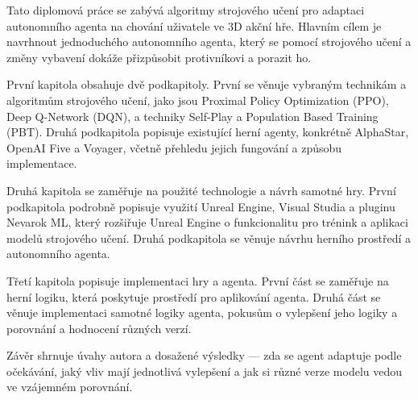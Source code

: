 Tato diplomová práce se zabývá algoritmy strojového učení pro adaptaci autonomního agenta na chování uživatele ve 3D akční hře. Hlavním cílem je navrhnout jednoduchého autonomního agenta, který se pomocí strojového učení a změny vybavení dokáže přizpůsobit protivníkovi a porazit ho.

První kapitola obsahuje dvě podkapitoly. První se věnuje vybraným technikám a algoritmům strojového učení, jako jsou Proximal Policy Optimization (PPO), Deep Q-Network (DQN), a techniky Self-Play a Population Based Training (PBT). Druhá podkapitola popisuje existující herní agenty, konkrétně AlphaStar, OpenAI Five a Voyager, včetně přehledu jejich fungování a způsobu implementace.

Druhá kapitola se zaměřuje na použité technologie a návrh samotné hry. První podkapitola podrobně popisuje využití Unreal Engine, Visual Studia a pluginu Nevarok ML, který rozšiřuje Unreal Engine o funkcionalitu pro trénink a aplikaci modelů strojového učení. Druhá podkapitola se věnuje návrhu herního prostředí a autonomního agenta.

Třetí kapitola popisuje implementaci hry a agenta. První část se zaměřuje na herní logiku, která poskytuje prostředí pro aplikování agenta. Druhá část se věnuje implementaci samotné logiky agenta, pokusům o vylepšení jeho logiky a porovnání a hodnocení různých verzí.

Závěr shrnuje úvahy autora a dosažené výsledky — zda se agent adaptuje podle očekávání, jaký vliv mají jednotlivá vylepšení a jak si různé verze modelu vedou ve vzájemném porovnání.